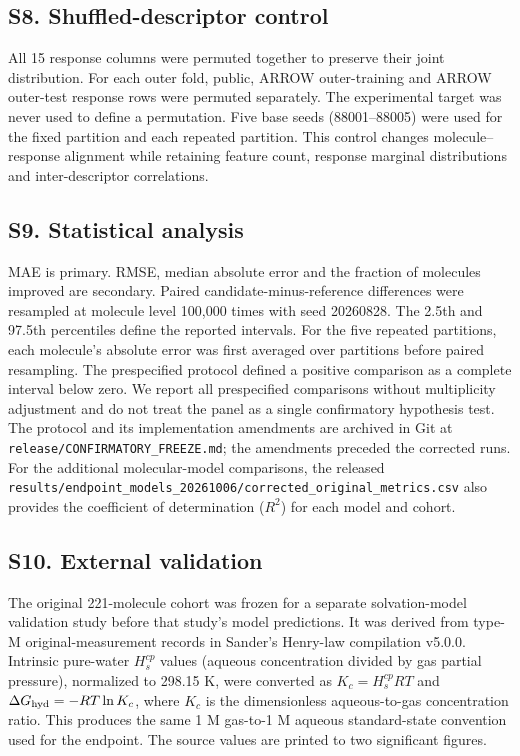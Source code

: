 \subsection*{S8. Shuffled-descriptor control}

All 15 response columns were permuted together to preserve their joint distribution.
For each outer fold, public, ARROW outer-training and ARROW outer-test response rows
were permuted separately. The experimental target was never used to define a
permutation. Five base seeds (88001--88005) were used for the fixed partition and
each repeated partition. This control changes molecule--response alignment while
retaining feature count, response marginal distributions and inter-descriptor
correlations.

\subsection*{S9. Statistical analysis}

MAE is primary. RMSE, median absolute error and the fraction of molecules
improved are secondary. Paired candidate-minus-reference differences were resampled
at molecule level 100,000 times with seed 20260828. The 2.5th and 97.5th
percentiles define the reported intervals. For the five repeated partitions, each
molecule's absolute error was first averaged over partitions before paired
resampling. The prespecified protocol defined a positive comparison as a complete interval
below zero. We report all prespecified comparisons without multiplicity adjustment
and do not treat the panel as a single confirmatory hypothesis test. The protocol
and its implementation amendments are archived in Git at
\nolinkurl{release/CONFIRMATORY_FREEZE.md}; the amendments preceded the corrected runs.
For the additional molecular-model comparisons, the released
\nolinkurl{results/endpoint_models_20261006/corrected_original_metrics.csv} also provides the coefficient of
determination ($R^2$) for each model and cohort.

\subsection*{S10. External validation}

The original 221-molecule cohort was frozen for a separate solvation-model validation
study before that study's model predictions. It was derived from type-M original-measurement
records in Sander's Henry-law compilation v5.0.0. Intrinsic pure-water
$H_s^{cp}$ values (aqueous concentration divided by gas partial pressure),
normalized to 298.15 K, were converted as
$K_c=H_s^{cp}RT$ and $\Delta G_{\rm hyd}=-RT\ln K_c$, where $K_c$ is the
dimensionless aqueous-to-gas concentration ratio. This produces the same 1 M
gas-to-1 M aqueous standard-state convention used for the endpoint. The source values
are printed to two significant figures.

